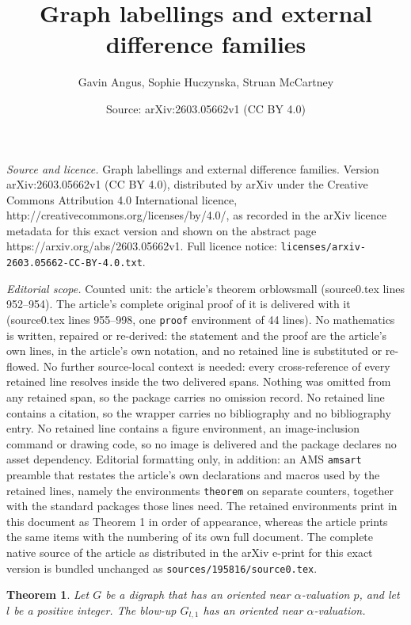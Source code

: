 \documentclass[10pt,a4paper]{amsart}
\title{Graph labellings and external difference families}
\author{Gavin Angus, Sophie Huczynska, Struan McCartney}
\date{Source: arXiv:2603.05662v1 (CC BY 4.0)}
\newtheorem{theorem}{Theorem}
\begin{document}
\maketitle

\noindent\emph{Source and licence.} Graph labellings and external difference families. Version arXiv:2603.05662v1 (CC BY 4.0), distributed by arXiv under the Creative Commons Attribution 4.0 International licence, http://creativecommons.org/licenses/by/4.0/, as recorded in the arXiv licence metadata for this exact version and shown on the abstract page https://arxiv.org/abs/2603.05662v1. Full licence notice: \texttt{licenses/arxiv-2603.05662-CC-BY-4.0.txt}.\par\smallskip

\noindent\textit{Editorial scope.} Counted unit: the article's theorem orblowsmall (source0.tex lines 952--954). The article's complete original proof of it is delivered with it (source0.tex lines 955--998, one \texttt{proof} environment of 44 lines). No mathematics is written, repaired or re-derived: the statement and the proof are the article's own lines, in the article's own notation, and no retained line is substituted or re-flowed.  No further source-local context is needed: every cross-reference of every retained line resolves inside the two delivered spans.  Nothing was omitted from any retained span, so the package carries no omission record.  No retained line contains a citation, so the wrapper carries no bibliography and no bibliography entry.  No retained line contains a figure environment, an image-inclusion command or drawing code, so no image is delivered and the package declares no asset dependency.  Editorial formatting only, in addition: an AMS \texttt{amsart} preamble that restates the article's own declarations and macros used by the retained lines, namely the environments \texttt{theorem} on separate counters, together with the standard packages those lines need.  The retained environments print in this document as Theorem 1 in order of appearance, whereas the article prints the same items with the numbering of its own full document.  The complete native source of the article as distributed in the arXiv e-print for this exact version is bundled unchanged as \texttt{sources/195816/source0.tex}.
\begin{theorem}\label{orblowsmall}
    Let $G$ be a digraph that has an oriented near $\alpha$-valuation $p$, and let $l$ be a positive integer. The blow-up $G_{l,1}$ has an oriented near $\alpha$-valuation.
\end{theorem}
\end{document}
